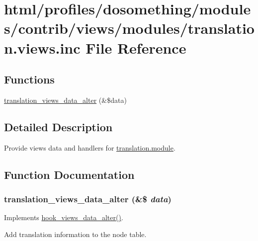 \hypertarget{translation_8views_8inc}{
\section{html/profiles/dosomething/modules/contrib/views/modules/translation.views.inc File Reference}
\label{translation_8views_8inc}
}
\subsection*{Functions}
\begin{DoxyCompactItemize}
\item 
\hyperlink{translation_8views_8inc_af5cdf5632190e288ac0d9518db433711}{translation\_\-views\_\-data\_\-alter} (\&\$data)
\end{DoxyCompactItemize}


\subsection{Detailed Description}
Provide views data and handlers for \hyperlink{translation_8module}{translation.module}. 

\subsection{Function Documentation}
\hypertarget{translation_8views_8inc_af5cdf5632190e288ac0d9518db433711}{
\subsubsection[{translation\_\-views\_\-data\_\-alter}]{\setlength{\rightskip}{0pt plus 5cm}translation\_\-views\_\-data\_\-alter (\&\$ {\em data})}}
\label{translation_8views_8inc_af5cdf5632190e288ac0d9518db433711}
Implements \hyperlink{group__views__hooks_ga6ae0bb0d2385e03c32b57625b6d35826}{hook\_\-views\_\-data\_\-alter()}.

Add translation information to the node table. 
